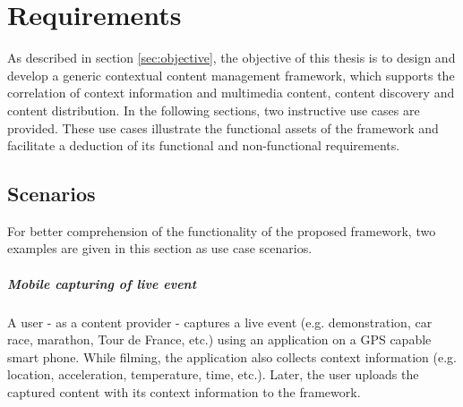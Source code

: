 \chapter{Requirements\label{cha:chapter3}}
As described in section \ref{sec:objective}, the objective of this thesis is to design and develop a generic contextual content management framework, which supports the correlation of context information and multimedia content, content discovery and content distribution. In the following sections, two instructive use cases are provided. These use cases illustrate the functional assets of the framework and facilitate a deduction of its functional and non-functional requirements.
 
%
% 
 
\section{Scenarios\label{sec:req_sce}}

For better comprehension of the functionality of the proposed framework, two examples are given in this section as use case scenarios.

\paragraph{Mobile capturing of live event}

A user - as a content provider - captures a live event (e.g. demonstration, car race, marathon, Tour de France, etc.) using an application on a \ac{GPS} capable smart phone. While filming, the application also collects context information (e.g. location, acceleration, temperature, time, etc.). Later, the user uploads the captured content with its context information to the framework.

